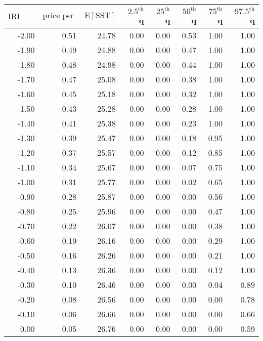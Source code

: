 \begin{table*}[ht]
\centering \footnotesize
\begin{tabular}{rrrrrrrr}
  \hline
$\mbox{IRI anom}$ & $\mbox{price per USD}$ & $\mbox{E}[\mbox{SST}]$ & $2.5^{\mbox{th}}$ q & $25^{\mbox{th}}$ q & $50^{\mbox{th}}$ q & $75^{\mbox{th}}$ q & $97.5^{\mbox{th}}$ q \\ 
  \hline
-2.00 & 0.51 & 24.78 & 0.00 & 0.00 & 0.53 & 1.00 & 1.00 \\ 
  -1.90 & 0.49 & 24.88 & 0.00 & 0.00 & 0.47 & 1.00 & 1.00 \\ 
  -1.80 & 0.48 & 24.98 & 0.00 & 0.00 & 0.44 & 1.00 & 1.00 \\ 
  -1.70 & 0.47 & 25.08 & 0.00 & 0.00 & 0.38 & 1.00 & 1.00 \\ 
  -1.60 & 0.45 & 25.18 & 0.00 & 0.00 & 0.32 & 1.00 & 1.00 \\ 
  -1.50 & 0.43 & 25.28 & 0.00 & 0.00 & 0.28 & 1.00 & 1.00 \\ 
  -1.40 & 0.41 & 25.38 & 0.00 & 0.00 & 0.23 & 1.00 & 1.00 \\ 
  -1.30 & 0.39 & 25.47 & 0.00 & 0.00 & 0.18 & 0.95 & 1.00 \\ 
  -1.20 & 0.37 & 25.57 & 0.00 & 0.00 & 0.12 & 0.85 & 1.00 \\ 
  -1.10 & 0.34 & 25.67 & 0.00 & 0.00 & 0.07 & 0.75 & 1.00 \\ 
  -1.00 & 0.31 & 25.77 & 0.00 & 0.00 & 0.02 & 0.65 & 1.00 \\ 
  -0.90 & 0.28 & 25.87 & 0.00 & 0.00 & 0.00 & 0.56 & 1.00 \\ 
  -0.80 & 0.25 & 25.96 & 0.00 & 0.00 & 0.00 & 0.47 & 1.00 \\ 
  -0.70 & 0.22 & 26.07 & 0.00 & 0.00 & 0.00 & 0.38 & 1.00 \\ 
  -0.60 & 0.19 & 26.16 & 0.00 & 0.00 & 0.00 & 0.29 & 1.00 \\ 
  -0.50 & 0.16 & 26.26 & 0.00 & 0.00 & 0.00 & 0.21 & 1.00 \\ 
  -0.40 & 0.13 & 26.36 & 0.00 & 0.00 & 0.00 & 0.12 & 1.00 \\ 
  -0.30 & 0.10 & 26.46 & 0.00 & 0.00 & 0.00 & 0.04 & 0.89 \\ 
  -0.20 & 0.08 & 26.56 & 0.00 & 0.00 & 0.00 & 0.00 & 0.78 \\ 
  -0.10 & 0.06 & 26.66 & 0.00 & 0.00 & 0.00 & 0.00 & 0.66 \\ 
  0.00 & 0.05 & 26.76 & 0.00 & 0.00 & 0.00 & 0.00 & 0.59 \\ 

\end{tabular}
\end{table*}
